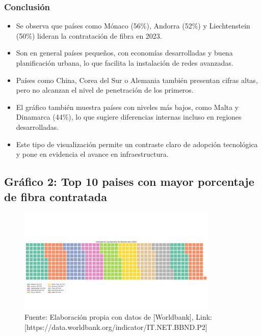 \documentclass[12pt, a4paper]{article}
\begin{document}
\subsubsection*{Conclusión}
\begin{itemize}
    \item Se observa que países como Mónaco (56\%), Andorra (52\%) y Liechtenstein (50\%) lideran la contratación de fibra en 2023.
    \item Son en general países pequeños, con economías desarrolladas y buena planificación urbana, lo que facilita la instalación de redes avanzadas.
    \item Países como China, Corea del Sur o Alemania también presentan cifras altas, pero no alcanzan el nivel de penetración de los primeros.
    \item El gráfico también muestra países con niveles más bajos, como Malta y Dinamarca (44\%), lo que sugiere diferencias internas incluso en regiones desarrolladas.
    \item Este tipo de visualización permite un contraste claro de adopción tecnológica y pone en evidencia el avance en infraestructura.
\end{itemize}

\subsection*{Gráfico 2: Top 10 paises con mayor porcentaje de fibra contratada}
\begin{figure}[H]
    \centering
    \includegraphics[width=0.85\textwidth]{images/Grafico_fibra_contratada_FC.webp}
    \caption{Fuente: Elaboración propia con datos de [Worldbank], Link: [https://data.worldbank.org/indicator/IT.NET.BBND.P2]}
\end{figure}
\end{document}
